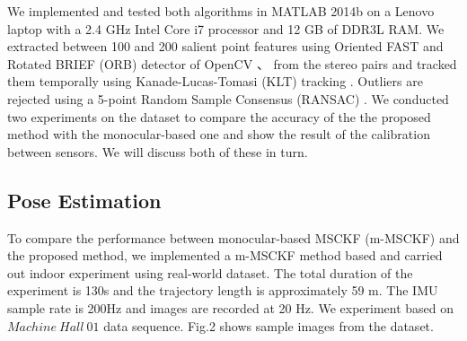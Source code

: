 \documentclass[a4paper, 10pt, conference]{ieeeconf}      %
\begin{document}
We implemented and tested both algorithms in MATLAB
2014b on a Lenovo laptop with a 2.4 GHz
Intel Core i7 processor and 12 GB of DDR3L RAM. We extracted between 100 and 200 salient point features  using Oriented FAST and Rotated BRIEF (ORB) detector \cite{rublee2011orb} of OpenCV 、\cite{opencv_library}  from the stereo pairs and tracked them temporally using Kanade-Lucas-Tomasi (KLT) tracking \cite{birchfield2007klt}.  Outliers are rejected 
using a 5-point  Random Sample Consensus (RANSAC) . We conducted two experiments on the dataset to compare the accuracy of the the proposed method with the monocular-based one and show the result of the calibration between sensors. We will discuss both of these in turn.



\subsection{Pose Estimation} 

To compare the performance between monocular-based MSCKF (m-MSCKF) and the proposed method, we implemented a m-MSCKF method based \cite{mourikis2007multi} and carried out indoor experiment using real-world dataset.  The total duration of the experiment is 130s and the trajectory length is approximately 59 m. The IMU sample rate is 200Hz and images are recorded at 20 Hz. We experiment based on $ Machine \ Hall \ 01 $ data sequence. Fig.2 shows sample images from the dataset.

\end{document}
